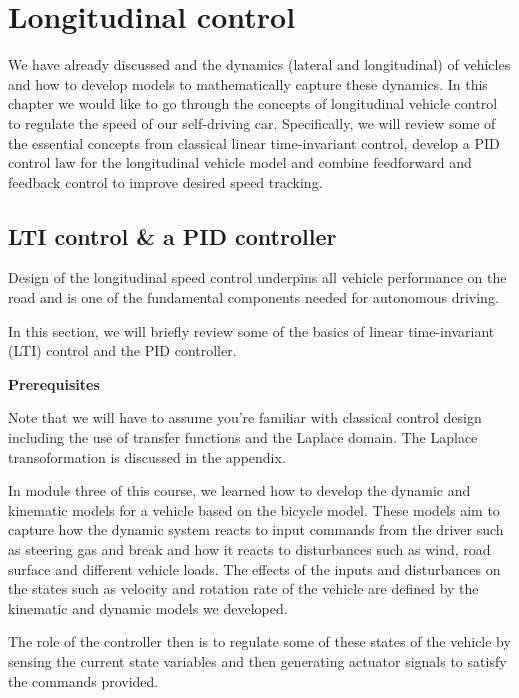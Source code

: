 \section{Longitudinal control}
\label{longitudinal_control}

We have already discussed and the dynamics (lateral and longitudinal) of vehicles and how to develop models to mathematically capture these dynamics. 
In this chapter we would like to go through the concepts of longitudinal vehicle control to regulate the speed of our self-driving car. 
Specifically, we will review some of the essential concepts from classical linear time-invariant control, develop a PID control law for the longitudinal vehicle model and combine feedforward and feedback control to improve desired speed tracking. 


\subsection{LTI control \& a PID controller}
Design of the longitudinal speed control underpins all vehicle performance on the road and is one of the fundamental components needed for autonomous driving. 

In this section, we will briefly review some of the basics of linear time-invariant (LTI) control and the PID controller. 

\begin{framed}
\theoremstyle{remark}
\begin{remark}{\textbf{Prerequisites}}

Note that we will have to assume you're familiar with classical control design including the use of transfer functions and the Laplace domain. 
The Laplace transoformation is discussed in the appendix.
\end{remark}
\end{framed}

In module three of this course, we learned how to develop the dynamic and kinematic models for a vehicle based on the bicycle model. 
These models aim to capture how the dynamic system reacts to input commands from the driver such as steering gas and break and how it reacts to disturbances such as wind, road surface and different vehicle loads. 
The effects of the inputs and disturbances on the states such as velocity and rotation rate of the vehicle 
are defined by the kinematic and dynamic models we developed. 

The role of the controller then is to regulate some of these states of the vehicle by sensing the current state variables and then generating actuator signals to satisfy the commands provided. 


